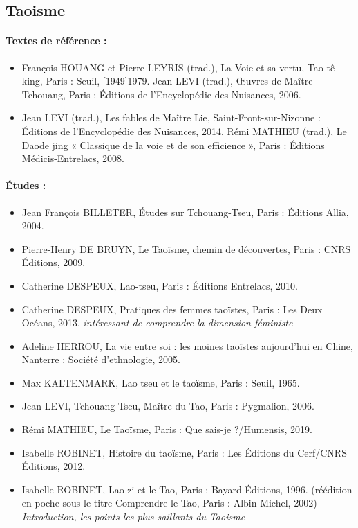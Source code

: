 \subsection{Taoisme}
\paragraph{Textes de référence :}


\begin{itemize}
    \item François HOUANG et Pierre LEYRIS (trad.), La Voie et sa vertu, Tao-tê-king, Paris : Seuil, [1949]1979.
Jean LEVI (trad.), Œuvres de Maître Tchouang, Paris : Éditions de l'Encyclopédie des Nuisances, 2006.
    \item Jean LEVI (trad.), Les fables de Maître Lie, Saint-Front-sur-Nizonne : Éditions de l’Encyclopédie des Nuisances, 2014. 
Rémi MATHIEU (trad.), Le Daode jing « Classique de la voie et de son efficience », Paris : Éditions Médicis-Entrelacs, 2008.  

\end{itemize}

\paragraph{Études :}

\begin{itemize}
    \item Jean François BILLETER, Études sur Tchouang-Tseu, Paris : Éditions Allia, 2004.
        \item Pierre-Henry DE BRUYN, Le Taoïsme, chemin de découvertes, Paris : CNRS Éditions, 2009. 
    \item Catherine DESPEUX, Lao-tseu, Paris : Éditions Entrelacs, 2010.
    \item Catherine DESPEUX, Pratiques des femmes taoïstes, Paris : Les Deux Océans, 2013. \textit{intéressant de comprendre la dimension féministe}
    \item Adeline HERROU, La vie entre soi : les moines taoïstes aujourd’hui en Chine, Nanterre : Société d’ethnologie, 2005.
    \item Max KALTENMARK, Lao tseu et le taoïsme, Paris : Seuil, 1965. 
        \item Jean LEVI, Tchouang Tseu, Maître du Tao, Paris : Pygmalion, 2006.
            \item Rémi MATHIEU, Le Taoïsme, Paris : Que sais-je ?/Humensis, 2019.

    \item Isabelle ROBINET, Histoire du taoïsme, Paris : Les Éditions du Cerf/CNRS Éditions, 2012.
    
    \item Isabelle ROBINET, Lao zi et le Tao, Paris : Bayard Éditions, 1996. 
    (réédition en poche sous le titre Comprendre le Tao, Paris : Albin Michel, 2002) \textit{Introduction, les points les plus saillants du Taoisme}

\end{itemize}







